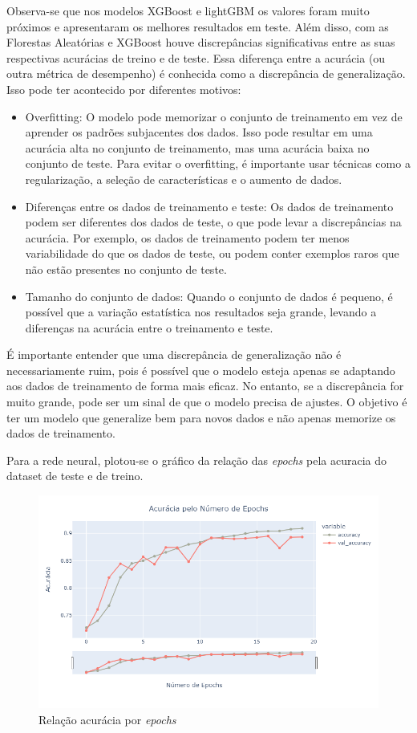 Observa-se que nos modelos XGBoost e lightGBM os valores foram muito próximos e apresentaram os melhores resultados em teste. Além disso, com as Florestas Aleatórias e XGBoost houve discrepâncias significativas entre as suas respectivas acurácias de treino e de teste. Essa diferença entre a acurácia (ou outra métrica de desempenho) é conhecida como a discrepância de generalização. Isso pode ter acontecido por diferentes motivos:

\begin{itemize}
    \item Overfitting: O modelo pode memorizar o conjunto de treinamento em vez de aprender os padrões subjacentes dos dados. Isso pode resultar em uma acurácia alta no conjunto de treinamento, mas uma acurácia baixa no conjunto de teste. Para evitar o overfitting, é importante usar técnicas como a regularização, a seleção de características e o aumento de dados.
    \item Diferenças entre os dados de treinamento e teste: Os dados de treinamento podem ser diferentes dos dados de teste, o que pode levar a discrepâncias na acurácia. Por exemplo, os dados de treinamento podem ter menos variabilidade do que os dados de teste, ou podem conter exemplos raros que não estão presentes no conjunto de teste.
    \item Tamanho do conjunto de dados: Quando o conjunto de dados é pequeno, é possível que a variação estatística nos resultados seja grande, levando a diferenças na acurácia entre o treinamento e teste.
\end{itemize}

É importante entender que uma discrepância de generalização não é necessariamente ruim, pois é possível que o modelo esteja apenas se adaptando aos dados de treinamento de forma mais eficaz. No entanto, se a discrepância for muito grande, pode ser um sinal de que o modelo precisa de ajustes. O objetivo é ter um modelo que generalize bem para novos dados e não apenas memorize os dados de treinamento.

Para a rede neural, plotou-se o gráfico da relação das \textit{epochs} pela acuracia do dataset de teste e de treino.
\begin{figure}[H]
    \centering
    \includegraphics[scale=0.55]{./figs/lstm_acuracy.png}
    \caption{Relação acurácia por \textit{epochs}}
    \label{fig:lstmacuracy}
\end{figure}

